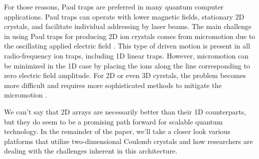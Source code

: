 For those reasons, Paul traps are preferred in many quantum computer applications. Paul traps can operate with lower magnetic fields, stationary 2D crystals, and facilitate individual addressing by laser beams. The main challenge in using Paul traps for producing 2D ion crystals comes from micromotion due to the oscillating applied electric field \cite{YeWang}. This type of driven motion is present in all radio-frequency ion traps, including 1D linear traps. However, micromotion can be minimized in the 1D case by placing the ions along the line corresponding to zero electric field amplitude. For 2D or even 3D cyrstals, the problem becomes more difficult and requires more sophisticated methods to mitigate the micromotion \cite{Kato2}.

We can't say that 2D arrays are necessarily better than their 1D counterparts, but they do seem to be a promising path forward for scalable quantum technology. In the remainder of the paper, we'll take a closer look various platforms that utilize two-dimensional Coulomb crystals and how researchers are dealing with the challenges inherent in this architecture.